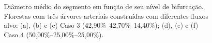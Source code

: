 \begin{figure}[!htb]
  \centering
  \captiondelim{: }
  \caption{Diâmetro médio do segmento em função de seu nível de bifurcação. 
  Florestas com três árvores arteriais construídas com diferentes fluxos alvo:
  (a), (b) e (c) Caso 3 (42,90\%--42,70\%--14,40\%); (d), (e) e (f) Caso 4 (50,00\%--25,00\%--25,00\%).}
  
  \hspace{12pt}


\end{figure}
